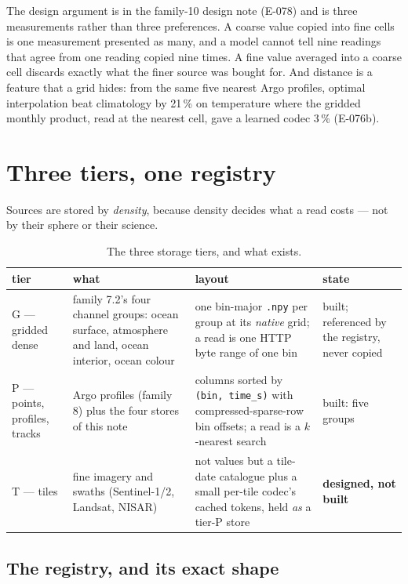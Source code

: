 \documentclass[10pt]{article}
\newcommand{\code}[1]{\texttt{#1}}
\begin{document}
The design argument is in the family-10 design note (E-078) and is three
measurements rather than three preferences. A coarse value copied into fine
cells is one measurement presented as many, and a model cannot tell nine
readings that agree from one reading copied nine times. A fine value averaged
into a coarse cell discards exactly what the finer source was bought for. And
distance is a feature that a grid hides: from the same five nearest Argo
profiles, optimal interpolation beat climatology by 21\,\% on temperature where
the gridded monthly product, read at the nearest cell, gave a learned codec
3\,\% (E-076b).

\section{Three tiers, one registry}

Sources are stored by \emph{density}, because density decides what a read
costs --- not by their sphere or their science.

\begin{table}[h]
\centering\setlength{\tabcolsep}{4pt}\footnotesize
\begin{tabular}{@{}>{\raggedright\arraybackslash}p{1.5cm}>{\raggedright\arraybackslash}p{4.4cm}>{\raggedright\arraybackslash}p{5.0cm}>{\raggedright\arraybackslash}p{4.0cm}@{}}
\toprule
tier & what & layout & state \\
\midrule
G --- gridded dense & family 7.2's four channel groups: ocean surface, atmosphere and land, ocean interior, ocean colour & one bin-major \code{.npy} per group at its \emph{native} grid; a read is one HTTP byte range of one bin & built; referenced by the registry, never copied \\
\addlinespace
P --- points, profiles, tracks & Argo profiles (family 8) plus the four stores of this note & columns sorted by \code{(bin, time\_s)} with compressed-sparse-row bin offsets; a read is a $k$-nearest search & built: five groups \\
\addlinespace
T --- tiles & fine imagery and swaths (Sentinel-1/2, Landsat, NISAR) & not values but a tile-date catalogue plus a small per-tile codec's cached tokens, held \emph{as} a tier-P store & \textbf{designed, not built} \\
\bottomrule
\end{tabular}
\caption{The three storage tiers, and what exists.}
\end{table}

\subsection{The registry, and its exact shape}
\end{document}
